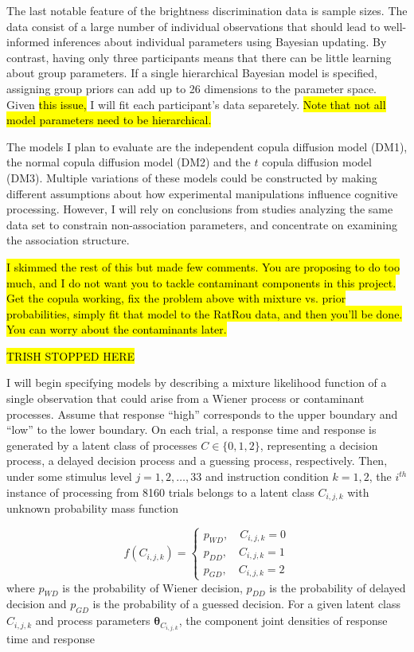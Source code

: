 \documentclass[12pt]{article}
\newcommand{\trish}[1]{\textrm{\hl{#1}}}
\begin{document}
The last notable feature of the brightness discrimination data is
sample sizes. The data consist of a large number of individual
observations that should lead to well-informed inferences about
individual parameters using Bayesian updating. By contrast,
having only three participants means that there can be little
learning about group parameters.  If a single
hierarchical Bayesian model is specified, assigning group priors can
add up to 26 dimensions to the parameter space. Given \trish{this
issue,} I will fit each participant's data separetely. \trish{Note
that not all model parameters need to be hierarchical.}

The models I plan to evaluate are the
independent copula diffusion model (DM1), the normal
copula diffusion model (DM2) and the $t$ copula
diffusion model (DM3). Multiple variations of these
models could be constructed by making different assumptions about how
experimental manipulations influence cognitive processing. However, I
will rely on conclusions from studies analyzing the same data set to
constrain non-association parameters, and concentrate on examining the
association structure.

\trish{I skimmed the rest of this but made few comments.  You are
proposing to do too much, and I do not want you to tackle contaminant
components in this project.  Get the copula working, fix the problem
above with mixture vs. prior probabilities, simply fit that model to
the RatRou data, and then you'll be done.  You can worry about the
contaminants later.}

\trish{TRISH STOPPED HERE}
 
I will begin specifying models by describing a mixture likelihood
function of a single observation that could arise from a Wiener
process or contaminant processes. Assume that response ``high''
corresponds to the upper boundary and ``low'' to the lower
boundary. On each trial, a response time and response is generated by
a latent class of processes $C \in \{0, 1, 2\}$, representing a
decision process, a delayed decision process and a guessing process,
respectively. Then, under some stimulus level $j = 1, 2, \dots, 33$
and instruction condition $k = 1, 2$, the $i^{th}$ instance of
processing from 8160 trials belongs to a latent class $C_{i,j,k}$ with
unknown probability mass function
    
\begin{equation}
f(C_{i,j,k}) = 
\begin{cases}
p_{WD}, \quad C_{i,j,k} = 0 \\
p_{DD}, \quad C_{i,j,k} = 1 \\
p_{GD}, \quad C_{i,j,k} = 2
\end{cases}
\end{equation}
where ${p_{WD}}$ is the probability of Wiener decision, ${p_{DD}}$ is the probability of delayed decision and ${p_{GD}}$ is the probability of a guessed decision. For a given latent class $C_{i,j,k}$ and process parameters $\boldsymbol{\theta}_{C_{i,j,k}}$, the component joint densities of response time and response 
\end{document}
